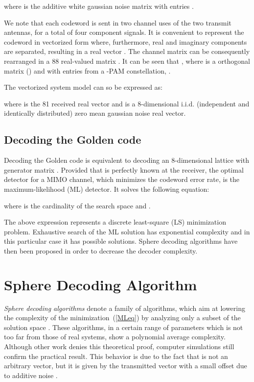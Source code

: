 \documentclass[12pt,onecolumn,draftclsnofoot]{IEEEtran}
\begin{document}
where  is the additive white gaussian noise matrix with entries
.

We note that each codeword is sent in two channel uses of the two
transmit antennas, for a total of four component signals. It is
convenient to represent the codeword  in vectorized form
where, furthermore, real and imaginary components are separated,
resulting in a  real vector . The channel
matrix  can be consequently rearranged in a
88 real-valued matrix . It can be seen that
, where
 is a  orthogonal matrix
() and  with entries from a
-PAM constellation, \cite{GoldenPage}.

The vectorized system model can so be expressed as:

\noindent where  is the 81 received real vector and
 is a 8-dimensional i.i.d. (independent and identically 
distributed) zero
mean gaussian noise real vector.


\subsection{Decoding the Golden code}
Decoding the Golden code is equivalent to decoding an 8-dimensional lattice
with generator matrix .
Provided that  is perfectly known at the
receiver, the optimal detector for a MIMO channel,
which minimizes the codeword error rate, is the maximum-likelihood (ML) detector.
It solves the following equation:


\noindent where  is the cardinality of the search space and .

The above expression represents a discrete least-square (LS) minimization problem. Exhaustive search
of the ML solution has exponential complexity and in this particular case it has
 possible solutions.
Sphere decoding algorithms have then been proposed in order to decrease
the decoder complexity.


\section{Sphere Decoding Algorithm}

\label{SD}

\emph{Sphere decoding algorithms}  denote a family of algorithms,
which aim at lowering the complexity of the
minimization~(\ref{MLeq}) by analyzing only a subset of the solution
space \cite{Caire&ot1}. These algorithms, in a certain range of
parameters which is not too far from those of real systems, show a
polynomial average complexity.
Although other work \cite{ControCompl} denies this theoretical
proof, computer simulations still confirm the practical result. This
behavior is due to the fact that  is not an
arbitrary vector, but it is given by the transmitted vector
 with a small offset due to additive
noise .
\end{document}
